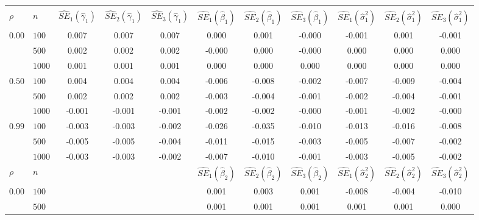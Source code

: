 \begin{landscape}
\begin{table}[ht]
\begin{center}
\begin{tabular}{llccccccccc}
   \thickhline \multicolumn{11}{c}{\textbf{Bias Estimates}}\\ $\rho$ & $n$ & $\widehat{SE}_1(\widehat{\gamma}_1)$ & $\widehat{SE}_2(\widehat{\gamma}_1)$ & $\widehat{SE}_3(\widehat{\gamma}_1)$ & $\widehat{SE}_1(\widehat{\beta}_1)$ & $\widehat{SE}_2(\widehat{\beta}_1)$ & $\widehat{SE}_3(\widehat{\beta}_1)$ & $\widehat{SE}_1(\widehat{\sigma}^2_1)$ & $\widehat{SE}_2(\widehat{\sigma}^2_1)$ & $\widehat{SE}_3(\widehat{\sigma}^2_1)$ \\ 
   \hline$0.00$ & $100$ & 0.007 & 0.007 & 0.007 & 0.000 & 0.001 & -0.000 & -0.001 & 0.001 & -0.001 \\ 
    & $500$ & 0.002 & 0.002 & 0.002 & -0.000 & 0.000 & -0.000 & 0.000 & 0.000 & 0.000 \\ 
    & $1000$ & 0.001 & 0.001 & 0.001 & 0.000 & 0.000 & 0.000 & 0.000 & 0.000 & 0.000 \\ 
  $0.50$ & $100$ & 0.004 & 0.004 & 0.004 & -0.006 & -0.008 & -0.002 & -0.007 & -0.009 & -0.004 \\ 
    & $500$ & 0.002 & 0.002 & 0.002 & -0.003 & -0.004 & -0.001 & -0.002 & -0.004 & -0.001 \\ 
    & $1000$ & -0.001 & -0.001 & -0.001 & -0.002 & -0.002 & -0.000 & -0.001 & -0.002 & -0.000 \\ 
  $0.99$ & $100$ & -0.003 & -0.003 & -0.002 & -0.026 & -0.035 & -0.010 & -0.013 & -0.016 & -0.008 \\ 
    & $500$ & -0.005 & -0.005 & -0.004 & -0.011 & -0.015 & -0.003 & -0.005 & -0.007 & -0.002 \\ 
    & $1000$ & -0.003 & -0.003 & -0.002 & -0.007 & -0.010 & -0.001 & -0.003 & -0.005 & -0.002 \\ 
   \hline$\rho$ & $n$ &   &   &   & $\widehat{SE}_1(\widehat{\beta}_2)$ & $\widehat{SE}_2(\widehat{\beta}_2)$ & $\widehat{SE}_3(\widehat{\beta}_2)$ & $\widehat{SE}_1(\widehat{\sigma}^2_2)$ & $\widehat{SE}_2(\widehat{\sigma}^2_2)$ & $\widehat{SE}_3(\widehat{\sigma}^2_2)$ \\ 
   \hline$0.00$ & $100$ &   &   &   & 0.001 & 0.003 & 0.001 & -0.008 & -0.004 & -0.010 \\ 
    & $500$ &   &   &   & 0.001 & 0.001 & 0.001 & 0.001 & 0.001 & 0.000 \\ 

\end{tabular}
\end{center}
\end{table}
\end{landscape}
